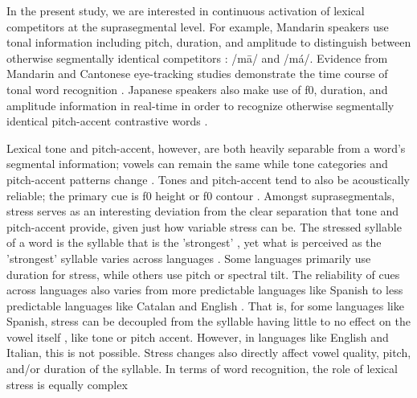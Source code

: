 In the present study, we are interested in continuous activation of lexical competitors at the suprasegmental level. For example, Mandarin speakers use tonal information including pitch, duration, and amplitude to distinguish between otherwise segmentally identical competitors \citep{Lee2008, Zhang2022, fox_1985}: /m\=a/ and /m\'a/. Evidence from Mandarin and Cantonese eye-tracking studies demonstrate the time course of tonal word recognition \citep{zou_2022, qin_2022, Nixon2016}. Japanese speakers also make use of f0, duration, and amplitude information in real-time in order to recognize otherwise segmentally identical pitch-accent contrastive words \citep{goss_2014, Cutler1999, Ito2024}.

Lexical tone and pitch-accent, however, are both heavily separable from a word's segmental information; vowels can remain the same while tone categories and pitch-accent patterns change \citep{Zeng2017}. Tones and pitch-accent tend to also be acoustically reliable; the primary cue is f0 height or f0 contour \citep{goss_2014}. Amongst suprasegmentals, stress serves as an interesting deviation from the clear separation that tone and pitch-accent provide, given just how variable stress can be. The stressed syllable of a word is the syllable that is the 'strongest' \citep{sluijter1996spectral}, yet what is perceived as the 'strongest' syllable varies across languages \citep{Cutler1988}. Some languages primarily use duration for stress, while others use pitch or spectral tilt. The reliability of cues across languages also varies from more predictable languages like Spanish to less predictable languages like Catalan and English \citep{ortega_2011, beckman_1994}. That is, for some languages like Spanish, stress can be decoupled from the syllable having little to no effect on the vowel itself \citep{ortega_2011}, like tone or pitch accent. However, in languages like English and Italian, this is not possible. Stress changes also directly affect vowel quality, pitch, and/or duration of the syllable. In terms of word recognition, the role of lexical stress is equally complex \citep{cutler2001voornaam, Reinisch2010}

